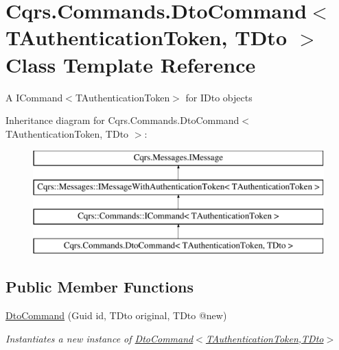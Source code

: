 \hypertarget{classCqrs_1_1Commands_1_1DtoCommand}{}\section{Cqrs.\+Commands.\+Dto\+Command$<$ T\+Authentication\+Token, T\+Dto $>$ Class Template Reference}
\label{classCqrs_1_1Commands_1_1DtoCommand}


A I\+Command$<$\+T\+Authentication\+Token$>$ for I\+Dto objects  


Inheritance diagram for Cqrs.\+Commands.\+Dto\+Command$<$ T\+Authentication\+Token, T\+Dto $>$\+:\begin{figure}[H]
\begin{center}
\leavevmode
\includegraphics[height=4.000000cm]{classCqrs_1_1Commands_1_1DtoCommand}
\end{center}
\end{figure}
\subsection*{Public Member Functions}
\begin{DoxyCompactItemize}
\item 
\hyperlink{classCqrs_1_1Commands_1_1DtoCommand_a705b7bdee6a242dd56821c60b4040b23_a705b7bdee6a242dd56821c60b4040b23}{Dto\+Command} (Guid id, T\+Dto original, T\+Dto @new)
\begin{DoxyCompactList}\small\item\em Instantiates a new instance of \hyperlink{classCqrs_1_1Commands_1_1DtoCommand_a705b7bdee6a242dd56821c60b4040b23_a705b7bdee6a242dd56821c60b4040b23}{Dto\+Command$<$\+T\+Authentication\+Token,\+T\+Dto$>$} \end{DoxyCompactList}\end{DoxyCompactItemize}
